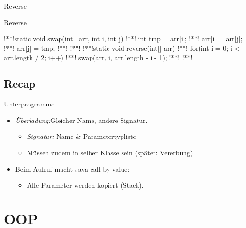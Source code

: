 {
\begin{frame}[c]{Reverse}
\flushleft{}
%
\end{frame}
\SidebarReset

\SidebarSolution
\begin{frame}[fragile,c]{Reverse}
\begin{plainjava}
!**!static void swap(int[] arr, int i, int j) {
!**!   int tmp = arr[i];
!**!   arr[i] = arr[j];
!**!   arr[j] = tmp;
!**!}
!**!
!**!static void reverse(int[] arr) {
!**!   for(int i = 0; i < arr.length / 2; i++) {
!**!      swap(arr, i, arr.length - i - 1);
!**!   }
!**!}
\end{plainjava}
\end{frame}
\SidebarReset

\subsection{Recap}
\begin{frame}[c]{\hfill Unterprogramme}
\begin{itemize}[<+(1)->]
   \itemsep18pt
   \item \textit{Überladung:}\hfill Gleicher Name, andere Signatur. \begin{itemize}
      \item \textit{Signatur:} Name \& Parametertypliste
      \item Müssen zudem in selber Klasse sein (später: Vererbung)
   \end{itemize}
   \item Beim Aufruf macht Java call-by-value: \begin{itemize}
      \item Alle Parameter werden kopiert (Stack).
   \end{itemize}
\end{itemize}
\LargeSide
\end{frame}


\section{OOP}
}
